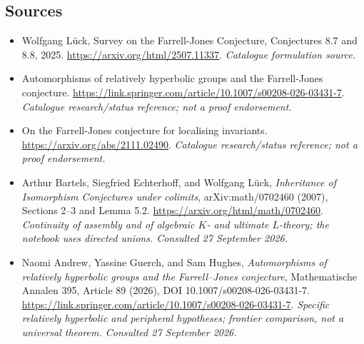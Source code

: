 \documentclass[11pt,a4paper]{article}
\numberwithin{equation}{section}
\begin{document}
\subsection{Sources}
\begin{itemize}\raggedright
\item[\textnormal{[S1]}]\hypertarget{source:1452:1}{} Wolfgang Lück, Survey on the Farrell-Jones Conjecture, Conjectures 8.7 and 8.8, 2025.
\url{https://arxiv.org/html/2507.11337}.
{\small\textit{Catalogue formulation source.}}
\item[\textnormal{[S2]}]\hypertarget{source:1452:2}{} Automorphisms of relatively hyperbolic groups and the Farrell-Jones conjecture.
\url{https://link.springer.com/article/10.1007/s00208-026-03431-7}.
{\small\textit{Catalogue research/status reference; not a proof endorsement.}}
\item[\textnormal{[S3]}]\hypertarget{source:1452:3}{} On the Farrell-Jones conjecture for localising invariants.
\url{https://arxiv.org/abs/2111.02490}.
{\small\textit{Catalogue research/status reference; not a proof endorsement.}}

\item[\textnormal{[E1]}]\hypertarget{extra:1452:1}{} Arthur Bartels, Siegfried Echterhoff, and Wolfgang Lück, \emph{Inheritance of Isomorphism Conjectures under colimits}, arXiv:math/0702460 (2007), Sections 2--3 and Lemma 5.2.
\url{https://arxiv.org/html/math/0702460}.
{\small\textit{Continuity of assembly and of algebraic $K$- and ultimate $L$-theory; the notebook uses directed unions. Consulted 27 September 2026.}}
\item[\textnormal{[E2]}]\hypertarget{extra:1452:2}{} Naomi Andrew, Yassine Guerch, and Sam Hughes, \emph{Automorphisms of relatively hyperbolic groups and the Farrell--Jones conjecture}, Mathematische Annalen 395, Article 89 (2026), DOI 10.1007/s00208-026-03431-7.
\url{https://link.springer.com/article/10.1007/s00208-026-03431-7}.
{\small\textit{Specific relatively hyperbolic and peripheral hypotheses; frontier comparison, not a universal theorem. Consulted 27 September 2026.}}
\end{itemize}
\end{document}
